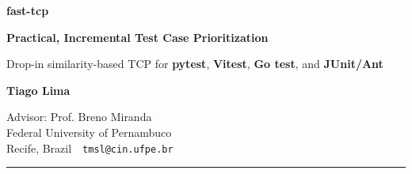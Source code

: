\documentclass[12pt]{article}
\begin{document}
  \color{ink}
  \fontsize{22}{29}\selectfont

  \begin{minipage}[b]{0.70\linewidth}
    {\bfseries\fontsize{84}{86}\selectfont fast\textcolor{accent}{-}tcp}\par
    \vspace{0.10in}
    {\bfseries\fontsize{40}{46}\selectfont Practical, Incremental Test Case Prioritization}\par
    \vspace{0.10in}
    {\fontsize{26}{30}\selectfont Drop-in similarity-based TCP for \textbf{pytest}, \textbf{Vitest}, \textbf{Go test}, and \textbf{JUnit/Ant}}
  \end{minipage}
  \hfill
  \begin{minipage}[b]{0.28\linewidth}
    \raggedleft
    {\bfseries\fontsize{28}{32}\selectfont Tiago Lima}\par
    \vspace{0.04in}
    {\color{soft}\fontsize{21}{25}\selectfont Advisor: Prof. Breno Miranda\\
    Federal University of Pernambuco\\
    Recife, Brazil \,\textbullet\, \texttt{tmsl@cin.ufpe.br}}
  \end{minipage}

  \vspace{0.16in}
  {\color{ink}\rule{\linewidth}{6pt}}
  \vspace{0.26in}
\end{document}
